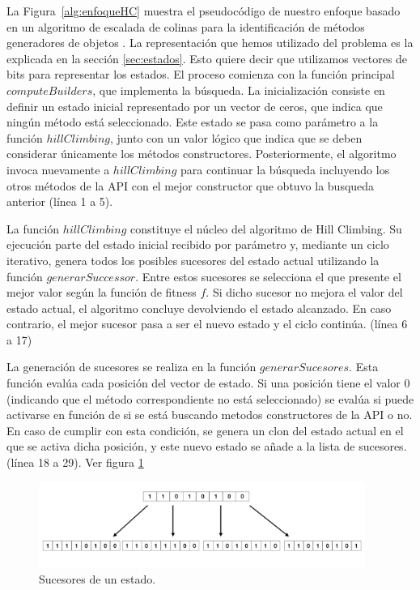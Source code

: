 La Figura~\ref{alg:enfoqueHC} muestra el pseudocódigo de nuestro enfoque basado en un algoritmo de escalada de colinas para la identificación de métodos generadores de objetos . 
La representación que hemos utilizado del problema es la explicada en la sección
\ref{sec:estados}. Esto quiere decir que utilizamos vectores de bits para
representar los estados. 
El proceso comienza con la función principal $computeBuilders$, que implementa
la búsqueda. 
La inicialización consiste en definir un estado inicial representado por un vector de ceros, 
que indica que ningún método está seleccionado. Este estado se pasa como parámetro a la función $hillClimbing$, junto con un valor lógico que indica que se deben considerar únicamente los métodos constructores. 
Posteriormente, el algoritmo invoca nuevamente a $hillClimbing$ para continuar la búsqueda incluyendo los otros métodos de la API con el mejor constructor que obtuvo
la busqueda anterior (línea 1 a 5).

La función $hillClimbing$ constituye el núcleo del algoritmo de Hill Climbing. Su ejecución parte del estado inicial recibido por parámetro y, 
mediante un ciclo iterativo, genera todos los posibles sucesores del estado actual utilizando la función $generarSuccessor$. 
Entre estos sucesores se selecciona el que presente el mejor valor según la función de fitness $f$. Si dicho sucesor no mejora el valor del estado actual,
el algoritmo concluye devolviendo el estado alcanzado. En caso contrario, el mejor sucesor pasa a ser el nuevo estado y el ciclo continúa. (línea 6 a 17)

La generación de sucesores se realiza en la función $generarSucesores$. Esta función evalúa cada posición del vector de estado. Si una posición tiene el valor 0 
(indicando que el método correspondiente no está seleccionado) se evalúa si puede activarse en función de si se está buscando metodos constructores de la API o no. 
En caso de cumplir con esta condición, se genera un clon del estado actual en el que se activa dicha posición, y este nuevo estado se añade a la lista de sucesores. (línea 18 a 29). Ver figura \ref{fig:succ-hillClimbing}

\begin{figure}[H]
    \centering
    \includegraphics[width=0.95\textwidth]{images/succesores.png}
    \caption{Sucesores de un estado.}
    \label{fig:succ-hillClimbing}
  \end{figure}
  
